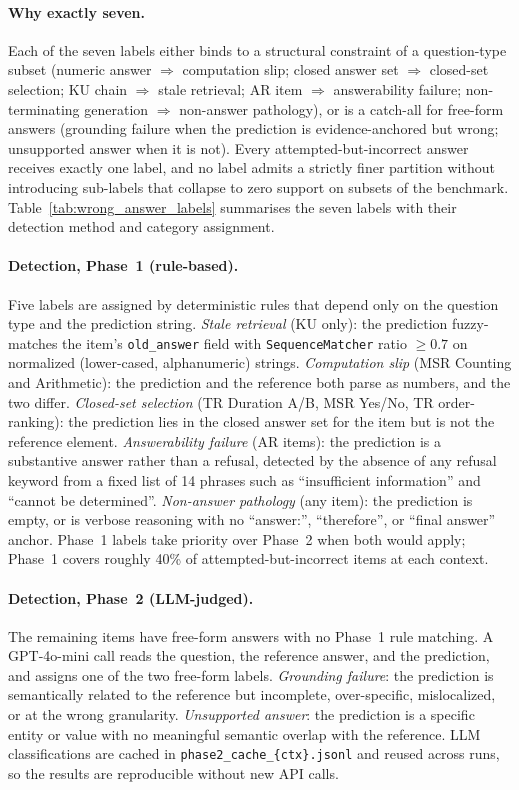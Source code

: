 \documentclass{llmxive}
\begin{document}
\paragraph{Why exactly seven.}
Each of the seven labels either binds to a structural constraint of a
question-type subset (numeric answer $\Rightarrow$ computation slip;
closed answer set $\Rightarrow$ closed-set selection; KU chain
$\Rightarrow$ stale retrieval; AR item $\Rightarrow$ answerability
failure; non-terminating generation $\Rightarrow$ non-answer
pathology), or is a catch-all for free-form answers (grounding failure
when the prediction is evidence-anchored but wrong; unsupported answer
when it is not). Every attempted-but-incorrect answer receives exactly
one label, and no label admits a strictly finer partition without
introducing sub-labels that collapse to zero support on subsets of the
benchmark. Table~\ref{tab:wrong_answer_labels} summarises the seven labels with their detection method and category assignment.

\paragraph{Detection, Phase~1 (rule-based).}
Five labels are assigned by deterministic rules that depend only on
the question type and the prediction string.
\emph{Stale retrieval} (KU only): the prediction fuzzy-matches the
item's \texttt{old\_answer} field with \texttt{SequenceMatcher}
ratio $\geq 0.7$ on normalized (lower-cased, alphanumeric) strings.
\emph{Computation slip} (MSR Counting and Arithmetic): the prediction
and the reference both parse as numbers, and the two differ.
\emph{Closed-set selection} (TR Duration A/B, MSR Yes/No, TR order-ranking):
the prediction lies in the closed answer set for the item but is not
the reference element.
\emph{Answerability failure} (AR items): the prediction is a
substantive answer rather than a refusal, detected by the absence of
any refusal keyword from a fixed list of 14 phrases such as
``insufficient information'' and ``cannot be determined''.
\emph{Non-answer pathology} (any item): the prediction is empty, or
is verbose reasoning with no ``answer:'', ``therefore'', or ``final
answer'' anchor. Phase~1 labels take priority over Phase~2 when both
would apply; Phase~1 covers roughly 40\% of attempted-but-incorrect
items at each context.

\paragraph{Detection, Phase~2 (LLM-judged).}
The remaining items have free-form answers with no Phase~1 rule
matching. A GPT-4o-mini call reads the question, the reference
answer, and the prediction, and assigns one of the two free-form
labels. \emph{Grounding failure}: the prediction is semantically
related to the reference but incomplete, over-specific, mislocalized,
or at the wrong granularity. \emph{Unsupported answer}: the
prediction is a specific entity or value with no meaningful semantic
overlap with the reference. LLM classifications are cached in
\texttt{phase2\_cache\_\{ctx\}.jsonl} and reused across runs, so the
results are reproducible without new API calls.
\end{document}

